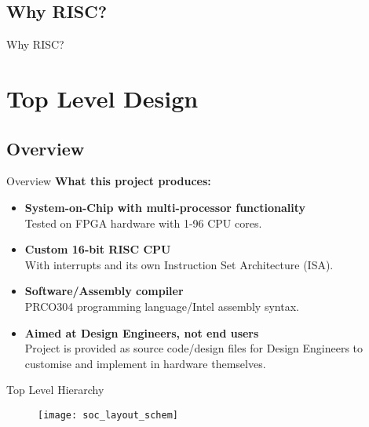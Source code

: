 \documentclass[aspectratio=169]{beamer}
\begin{document}
\subsection{Why RISC?}
\begin{frame}{Why RISC?}
\end{frame}

\section{Top Level Design}
\frame{\tableofcontents[currentsection, subsectionstyle=show/show/hide]}

\subsection{Overview}
\begin{frame}{Overview}
\textbf{What this project produces:}
\begin{itemize}[<+->]\setlength\itemsep{1em}
    \item{\textbf{System-on-Chip with multi-processor functionality}\\
    Tested on FPGA hardware with 1-96 CPU cores.}
    
    \item{\textbf{Custom 16-bit RISC CPU}\\
    With interrupts and its own Instruction Set Architecture (ISA).}
    
    \item{\textbf{Software/Assembly compiler}\\
    PRCO304 programming language/Intel assembly syntax.}
    
    \item{\textbf{Aimed at Design Engineers, not end users}\\
    Project is provided as source code/design files for Design Engineers to customise and implement in hardware themselves.}
\end{itemize}
\end{frame}

\begin{frame}{Top Level Hierarchy}
\vspace{-.3cm}
\begin{figure}
\texttt{[image: soc\_layout\_schem]}
\end{figure}
\end{frame}
\end{document}
